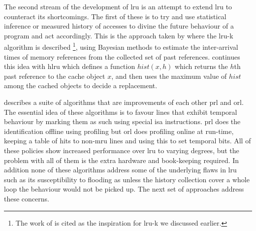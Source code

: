 The second stream of the development of \gls{lru} is an attempt to extend  \gls{lru} to counteract its shortcomings. The first of these is to try and use statistical inference or measured history of accesses to divine the future behaviour of a program and act accordingly. This is the approach taken by \citet{oneilLRUKPageReplacement1993} where the \gls{lru-k} algorithm is described \footnote{The work of \citet{oneilLRUKPageReplacement1993} is cited as the inspiration for \gls{lru-k} we discussed earlier.}, using Bayesian methods to estimate the inter-arrival times of memory references from the collected set of past references. \citet{vakaliLRUbasedAlgorithmsWeb2000} continues this idea with \gls{hlru} which defines a function $hist(x,h)$ which returns the $h$th past reference to the cache object $x$, and then uses the maximum value of $hist$ among the cached objects to decide a replacement.

\citet{wongModifiedLRUPolicies2000} describes a suite of algorithms that are improvements of each other \gls{prl} and \gls{orl}. The essential idea of these algorithms is to favour lines that exhibit temporal behaviour by marking them as such using special \gls{isa} instructions. \gls{prl} does the identification offline using profiling but \gls{orl} does profiling online at run-time, keeping a table of hits to non-\gls{mru} lines and using this to set temporal bits. All of these policies show increased performance over \gls{lru} to varying degrees, but the problem with all of them is the extra hardware and book-keeping required. In addition none of these algorithms address some of the underlying flaws in \gls{lru} such as its susceptibility to flooding \cite{glassAdaptivePageReplacement1997} as unless the history collection cover a whole loop the behaviour would not be picked up. The next set of approaches address these concerns.

